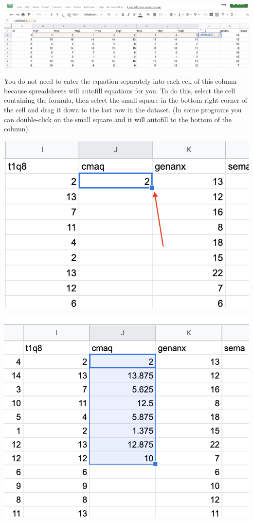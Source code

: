 \documentclass[
]{book}
\begin{document}
\includegraphics{img/averagefun3.png}

You do not need to enter the equation separately into each cell of this column because spreadsheets will autofill equations for you. To do this, select the cell containing the formula, then select the small square in the bottom right corner of the cell and drag it down to the last row in the dataset. (In some programs you can double-click on the small square and it will autofill to the bottom of the column).

\includegraphics{img/smallbox.png}

\includegraphics{img/pull.png}
\end{document}
